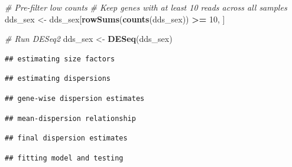 \documentclass[
]{article}
\newenvironment{Shaded}{\begin{snugshade}}{\end{snugshade}}
\newcommand{\AttributeTok}[1]{\textcolor[rgb]{0.13,0.29,0.53}{#1}}
\newcommand{\CommentTok}[1]{\textcolor[rgb]{0.56,0.35,0.01}{\textit{#1}}}
\newcommand{\DecValTok}[1]{\textcolor[rgb]{0.00,0.00,0.81}{#1}}
\newcommand{\FunctionTok}[1]{\textcolor[rgb]{0.13,0.29,0.53}{\textbf{#1}}}
\newcommand{\NormalTok}[1]{#1}
\newcommand{\OtherTok}[1]{\textcolor[rgb]{0.56,0.35,0.01}{#1}}
\newcommand{\SpecialCharTok}[1]{\textcolor[rgb]{0.81,0.36,0.00}{\textbf{#1}}}
\begin{document}
\begin{Shaded}
\end{Shaded}

\begin{Shaded}
\begin{Highlighting}[]
\CommentTok{\# Pre{-}filter low counts }
\CommentTok{\# Keep genes with at least 10 reads across all samples}
\NormalTok{dds\_sex }\OtherTok{\textless{}{-}}\NormalTok{ dds\_sex[}\FunctionTok{rowSums}\NormalTok{(}\FunctionTok{counts}\NormalTok{(dds\_sex)) }\SpecialCharTok{\textgreater{}=} \DecValTok{10}\NormalTok{, ]}

\CommentTok{\# Run DESeq2 }
\NormalTok{dds\_sex }\OtherTok{\textless{}{-}} \FunctionTok{DESeq}\NormalTok{(dds\_sex)}
\end{Highlighting}
\end{Shaded}

\begin{verbatim}
## estimating size factors
\end{verbatim}

\begin{verbatim}
## estimating dispersions
\end{verbatim}

\begin{verbatim}
## gene-wise dispersion estimates
\end{verbatim}

\begin{verbatim}
## mean-dispersion relationship
\end{verbatim}

\begin{verbatim}
## final dispersion estimates
\end{verbatim}

\begin{verbatim}
## fitting model and testing
\end{verbatim}
\end{document}
